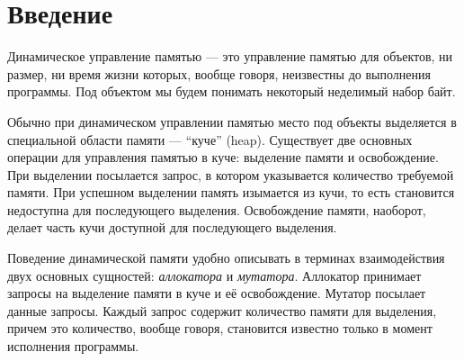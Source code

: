 \documentclass[12pt,a4paper]{article}
\renewcommand\baselinestretch{1.5}
\begin{document}

\tableofcontents    
\newpage
\section*{Введение}
   Динамическое управление памятью --- это управление памятью для объектов, ни размер, ни время жизни которых, вообще говоря, неизвестны до
   выполнения программы. Под объектом мы будем понимать некоторый неделимый набор байт.
   
   Обычно при динамическом управлении памятью место под объекты выделяется в специальной области памяти --- \textquotedblleft куче\textquotedblright
   (heap). Существует
   две основных операции для управления памятью в куче: выделение памяти и освобождение. При выделении посылается запрос, в котором указывается количество
   требуемой памяти. При успешном выделении память изымается из кучи, то есть становится недоступна для последующего выделения.
   Освобождение памяти, наоборот, делает часть кучи доступной для последующего выделения.
   
   Поведение динамической памяти удобно описывать в терминах взаимодействия двух основных сущностей: \emph{аллокатора} и \emph{мутатора}. Аллокатор принимает запросы на выделение
   памяти в куче и её освобождение. Мутатор посылает данные запросы. Каждый запрос содержит количество памяти для выделения, причем 
   это количество, вообще говоря, становится известно только в момент исполнения программы.
   
\end{document}
